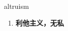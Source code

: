 
\begin{frame}
{\huge altruism}
\begin{center}
\begin{enumerate}\Large
  \item \textbf{利他主义，无私}
\end{enumerate}
\end{center}
\end{frame}
